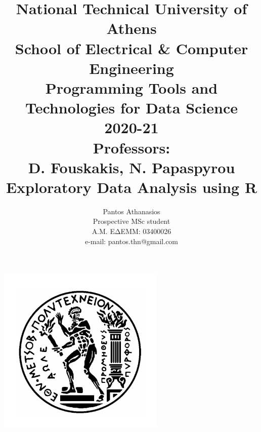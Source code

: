 \documentclass[11pt, a4paper]{article}
\title{\textbf{National Technical University of Athens} \\
School of Electrical \& Computer Engineering \\
\textbf{Programming Tools and Technologies for Data Science 2020-21} \\
Professors: \\ D. Fouskakis, N. Papaspyrou \\
\textbf{Exploratory Data Analysis using R}\\}
\author{Pantos Athanasios \\ Prospective MSc student \\ Α.Μ. ΕΔΕΜΜ: 03400026 \\
e-mail: pantos.thn@gmail.com}
\begin{document}
    \maketitle
    \thispagestyle{empty}
    \begin{center}
        \includegraphics[width=8cm]{images/ntua.png}
    \end{center}
    \break
    \thispagestyle{empty}
    \tableofcontents
    
    \listoffigures
    
    \listoftables
    
    \clearpage

    


\newpage



%

%
%



%
%
\end{document}
